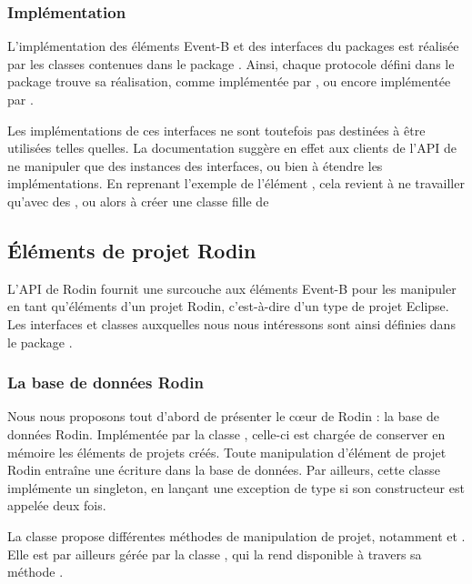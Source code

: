 \subsubsection{Implémentation}

L'implémentation des éléments Event-B et des interfaces du packages  est réalisée par les classes contenues dans %
le package .
Ainsi, chaque protocole défini dans le package  trouve sa réalisation, comme  implémentée par %
, ou encore  implémentée par .

Les implémentations de ces interfaces ne sont toutefois pas destinées à être utilisées telles quelles.
La documentation suggère en effet aux clients de l'API de ne manipuler que des instances des interfaces, ou bien à étendre les implémentations.
En reprenant l'exemple de l'élément , cela revient à ne travailler qu'avec des , ou alors à créer une classe fille de 


\subsection{Éléments de projet Rodin}

L'API de Rodin fournit une surcouche aux éléments Event-B pour les manipuler en tant qu'éléments d'un projet Rodin, c'est-à-dire d'un type de projet Eclipse.
Les interfaces et classes auxquelles nous nous intéressons sont ainsi définies dans le package .

\subsubsection{La base de données Rodin}

Nous nous proposons tout d'abord de présenter le cœur de Rodin : la base de données Rodin.
Implémentée par la classe , celle-ci est chargée de conserver en mémoire les éléments de projets créés.
Toute manipulation d'élément de projet Rodin entraîne une écriture dans la base de données.
Par ailleurs, cette classe implémente un singleton, en lançant une exception de type  si son constructeur est appelée deux fois.

La classe  propose différentes méthodes de manipulation de projet, notamment  et .
Elle est par ailleurs gérée par la classe , qui la rend disponible à travers sa méthode .


